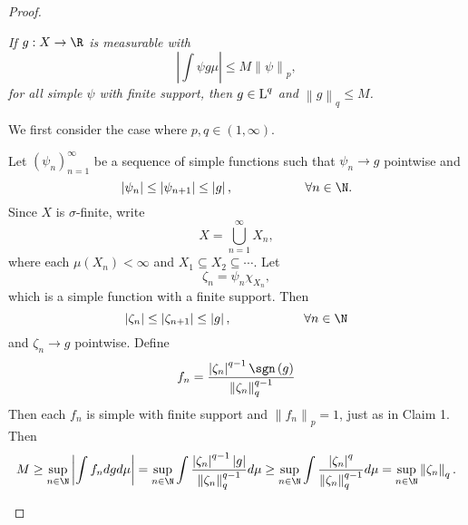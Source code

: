 \documentclass[pmath451]{subfiles}
\begin{document}
\begin{proof}
        \begin{claim}
            \textit{If $g:X\to\R$ is measurable with
                \begin{equation*}
                    \left| \int\psi g\mu \right| \leq M\left\lVert \psi\right\rVert_p,
                \end{equation*}
                for all simple $\psi$ with finite support, then $g\in\operatorname{L}^q$ and $\left\lVert g\right\rVert_q\leq M$.
            }

            \clearpage

            We first consider the case where $p,q\in\left( 1,\infty \right)$.

            Let $\left( \psi_{n} \right)^{\infty}_{n=1}$ be a sequence of simple functions such that $\psi_n\to g$ pointwise and
            \begin{equation*}
                \left| \psi_n \right|\leq\left| \psi_{n+1} \right|\leq\left| g \right|, \hspace{2cm}\forall n\in\N.
            \end{equation*}
            Since $X$ is $\sigma$-finite, write
            \begin{equation*}
                X = \bigcup^{\infty}_{n=1} X_n,
            \end{equation*}
            where each $\mu\left( X_n \right)<\infty$ and $X_1\subseteq X_2\subseteq \cdots$. Let
            \begin{equation*}
                \zeta_n = \psi_n\chi_{X_n},
            \end{equation*}
            which is a simple function with a finite support. Then
            \begin{equation*}
                \left| \zeta_n \right|\leq\left| \zeta_{n+1} \right|\leq\left| g \right|,\hspace{2cm}\forall n\in\N
            \end{equation*}
            and $\zeta_n\to g$ pointwise. Define
            \begin{equation*}
                f_n = \frac{\left| \zeta_n \right|^{q-1}\sgn\left( g \right)}{\left\lVert \zeta_n\right\rVert_q^{q-1}}
            \end{equation*}
            Then each $f_n$ is simple with finite support and $\left\lVert f_n\right\rVert_p = 1$, just as in Claim 1. Then
            \begin{equation*}
                M \geq \sup_{n\in\N}\left| \int f_ndgd\mu \right| = \sup_{n\in\N} \int \frac{\left| \zeta_n \right|^{q-1}\left| g \right|}{\left\lVert \zeta_n\right\rVert_q^{q-1}}d\mu \geq \sup_{n\in\N} \int \frac{\left| \zeta_n \right|^q}{\left\lVert \zeta_n\right\rVert_q^{q-1}}d\mu = \sup_{n\in\N}\left\lVert \zeta_n\right\rVert_q.

\end{equation*}
\end{claim}
\end{proof}
\end{document}
